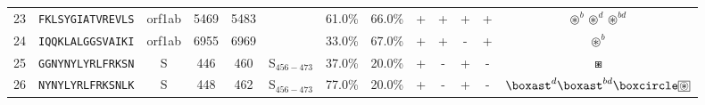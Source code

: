 \begin{tabular}{rcccccccccccc}
23 &  \texttt{FKLSYGIATVREVLS} &  orf1ab &   5469 &  5483 &                &                          61.0\% &                           66.0\% &          + &           + &          + &           + &                                                                        $ \circledast^b \circledast^d \circledast^{bd} $ \\
24 &  \texttt{IQQKLALGGSVAIKI} &  orf1ab &   6955 &  6969 &                &                          33.0\% &                           67.0\% &          + &           + &          - &           + &                                                                                                       $ \circledast^b $ \\
25 &  \texttt{GGNYNYLYRLFRKSN} &       S &    446 &   460 &  S$_{456-473}$ &                          37.0\% &                           20.0\% &          + &           - &          + &           - &                                                                                                             $ \boxast $ \\
26 &  \texttt{NYNYLYRLFRKSNLK} &       S &    448 &   462 &  S$_{456-473}$ &                          77.0\% &                           20.0\% &          + &           - &          + &           - &                                   $ \boxast^d \boxast^{bd} \boxcircle \setlength{\fboxsep}{0.5pt} \boxed{\circledast} $ \\
\bottomrule
\end{tabular}
